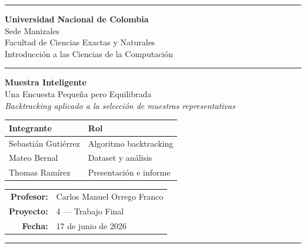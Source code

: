 \documentclass[12pt, a4paper]{article}
\begin{document}

\begin{titlepage}
  \centering

  \vspace*{1cm}

  {\color{unalverde}\rule{\linewidth}{2pt}}
  \vspace{0.4cm}

  {\LARGE\bfseries\color{unalverde} Universidad Nacional de Colombia}\\[0.3cm]
  {\large Sede Manizales}\\[0.2cm]
  {\normalsize Facultad de Ciencias Exactas y Naturales}\\[0.2cm]
  {\normalsize Introducción a las Ciencias de la Computación}

  \vspace{0.6cm}
  {\color{unalverde}\rule{\linewidth}{1pt}}

  \vspace{1.2cm}

  {\Huge\bfseries Muestra Inteligente}\\[0.4cm]
  {\Large Una Encuesta Pequeña pero Equilibrada}\\[0.6cm]
  {\large\itshape Backtracking aplicado a la selección de muestras representativas}

  \vspace{1.4cm}

  \begin{tabular}{ll}
    \toprule
    \textbf{Integrante}    & \textbf{Rol} \\
    \midrule
    Sebastián Gutiérrez    & Algoritmo backtracking \\
    Mateo Bernal           & Dataset y análisis \\
    Thomas Ramírez         & Presentación e informe \\
    \bottomrule
  \end{tabular}

  \vspace{1.4cm}

  \begin{tabular}{rl}
    \textbf{Profesor:}   & Carlos Manuel Orrego Franco \\
    \textbf{Proyecto:}   & 4 — Trabajo Final \\
    \textbf{Fecha:}      & 17 de junio de 2026 \\
  \end{tabular}

  \vspace{1.2cm}
  {\color{unalverde}\rule{\linewidth}{2pt}}

\end{titlepage}
\end{document}
